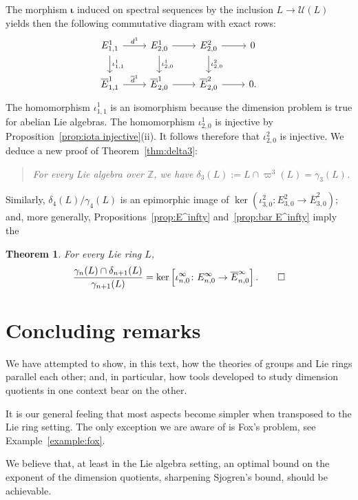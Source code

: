 \documentclass[a4paper,reqno,notitlepage]{amsart}
\newtheorem{theorem}{Theorem}[section]
\theoremstyle{definition}
\newcommand{\Z}{\mathbb Z}
\newcommand\U{\mathscr U}
\begin{document}
The morphism $\boldsymbol\iota$ induced on spectral sequences by the
inclusion $L\to\U(L)$ yields then the following commutative diagram
with exact rows:
\[\begin{tikzcd}
  E^{1}_{1,1}\arrow{r}{d^1}\arrow{d}{\iota^1_{1,1}} & E^1_{2,0}\arrow{r}\arrow{d}{\iota^1_{2,0}} & E^2_{2,0}\arrow{r}\arrow{d}{\iota^2_{2,0}} & 0\\
  \overline{E}^{1}_{1,1}\arrow{r}{\overline d^1} & \overline{E}^1_{2,0}\arrow{r} & \overline{E}^2_{2,0}\arrow{r} & 0.
\end{tikzcd}
\]
The homomorphism $\iota^1_{1,1}$ is an isomorphism because the
dimension problem is true for abelian Lie algebras. The homomorphism
$\iota^1_{2,0}$ is injective by Proposition~\ref{prop:iota
  injective}(ii). It follows therefore that $\iota^2_{2,0}$ is
injective. We deduce a new proof of Theorem~\ref{thm:delta3}:
\begin{quote}
  \itshape For every Lie algebra over $\Z$, we have
  $\delta_3(L):=L\cap\varpi^3(L)=\gamma_3(L)$.
\end{quote}

Similarly, $\delta_4(L)/\gamma_4(L)$ is an epimorphic image of
$\ker(\iota^2_{3,0}:E^2_{3,0}\to \overline{E}^2_{3,0})$; and, more
generally, Propositions~\ref{prop:E^infty} and~\ref{prop:bar E^infty}
imply the
\begin{theorem} For every Lie ring $L$,
  \[\frac{\gamma_n(L)\cap\delta_{n+1}(L)}{\gamma_{n+1}(L)}=\ker\left[\iota^\infty_{n,0}\colon E^\infty_{n,0}\to\overline E^\infty_{n,0}\right].\qed\]
\end{theorem}

\section{Concluding remarks}
We have attempted to show, in this text, how the theories of groups
and Lie rings parallel each other; and, in particular, how tools
developed to study dimension quotients in one context bear on the
other.

It is our general feeling that most aspects become simpler when
transposed to the Lie ring setting. The only exception we are aware of
is Fox's problem, see Example~\ref{example:fox}.

We believe that, at least in the Lie algebra setting, an optimal bound
on the exponent of the dimension quotients, sharpening Sjogren's
bound, should be achievable.
\end{document}
